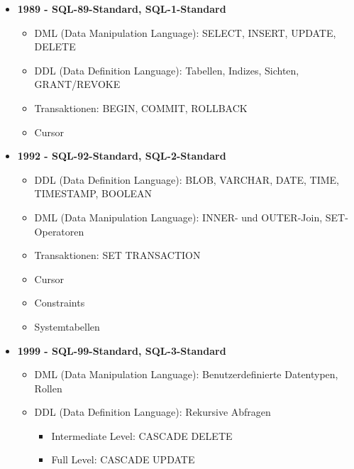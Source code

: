 \begin{itemize}
    \item \textbf{1989 - SQL-89-Standard, SQL-1-Standard}
          \begin{small}
              \begin{itemize}
                  \item DML (Data Manipulation Language): SELECT, INSERT, UPDATE, DELETE
                  \item DDL (Data Definition Language): Tabellen, Indizes, Sichten, GRANT/REVOKE
                  \item Transaktionen: BEGIN, COMMIT, ROLLBACK
                  \item Cursor
              \end{itemize}
          \end{small}
    \item \textbf{1992 - SQL-92-Standard, SQL-2-Standard}
          \begin{small}
              \begin{itemize}
                  \item DDL (Data Definition Language): BLOB, VARCHAR, DATE, TIME, TIMESTAMP, BOOLEAN
                  \item DML (Data Manipulation Language): INNER- und OUTER-Join, SET-Operatoren
                  \item Transaktionen: SET TRANSACTION
                  \item Cursor
                  \item Constraints
                  \item Systemtabellen
              \end{itemize}
          \end{small}
    \item \textbf{1999 - SQL-99-Standard, SQL-3-Standard}
          \begin{small}
              \begin{itemize}
                  \item DML (Data Manipulation Language): Benutzerdefinierte Datentypen, Rollen
                  \item DDL (Data Definition Language): Rekursive Abfragen
                        \begin{itemize}
                            \item Intermediate Level: CASCADE DELETE
                            \item Full Level: CASCADE UPDATE
                        \end{itemize}

\end{itemize}
\end{small}
\end{itemize}
